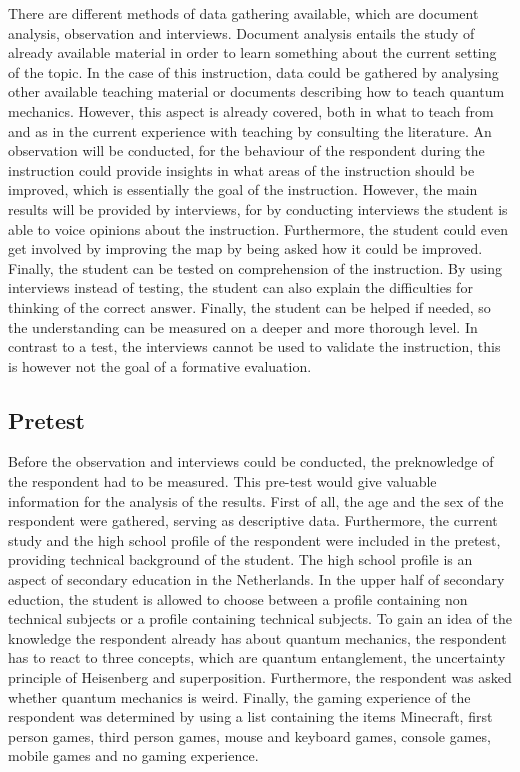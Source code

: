 \documentclass[11pt,twoside]{report} %
\begin{document}
There are different methods of data gathering available, which are document analysis, observation and interviews. Document analysis entails the study of already available material in order to learn something about the current setting of the topic. In the case of this instruction, data could be gathered by analysing other available teaching material or documents describing how to teach quantum mechanics. However, this aspect is already covered, both in what to teach from  and as in the current experience with teaching by consulting the literature. An observation will be conducted, for the behaviour of the respondent during the instruction could provide insights in what areas of the instruction should be improved, which is essentially the goal of the instruction. However, the main results will be provided by interviews, for by conducting interviews the student is able to voice opinions about the instruction. Furthermore, the student could even get involved by improving the map by being asked how it could be improved. Finally, the student can be tested on comprehension of the instruction. By using interviews instead of testing, the student can also explain the difficulties for thinking of the correct answer. Finally, the student can be helped if needed, so the understanding can be measured on a deeper and more thorough level. In contrast to a test, the interviews cannot be used to validate the instruction, this is however not the goal of a formative evaluation.

\subsection{Pretest}

Before the observation and interviews could be conducted, the preknowledge of the respondent had to be measured. This pre-test would give valuable information for the analysis of the results. First of all, the age and the sex of the respondent were gathered, serving as descriptive data. Furthermore, the current study and the high school profile of the respondent were included in the pretest, providing technical background of the student. The high school profile is an aspect of secondary education in the Netherlands. In the upper half of secondary eduction, the student is allowed to choose between a profile containing non technical subjects or a profile containing technical subjects. To gain an idea of the knowledge the respondent already has about quantum mechanics, the respondent has to react to three concepts, which are quantum entanglement, the uncertainty principle of Heisenberg and superposition. Furthermore, the respondent was asked whether quantum mechanics is weird. Finally, the gaming experience of the respondent was determined by using a list containing the items Minecraft, first person games, third person games, mouse and keyboard games, console games, mobile games and no gaming experience.
\end{document}
